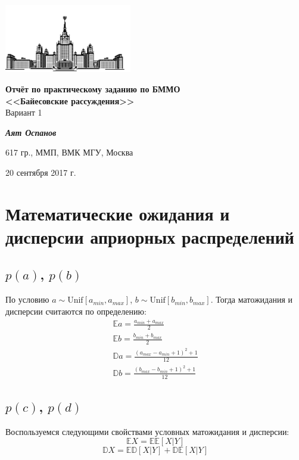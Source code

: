 \documentclass[12pt, a4paper]{article}
\begin{document}
    \begin{singlespace}
    \begin{center}
        \includegraphics[height=3cm]{msu.png}

        {\large\textbf{Отчёт по практическому заданию по БММО\\
        <<Байесовские рассуждения>>}\\
        Вариант 1}

        \vspace{0.3cm}

        \textit{\textbf{Аят Оспанов}}

        617 гр., ММП, ВМК МГУ, Москва

        20 сентября 2017 г.
    \end{center}
    \end{singlespace}

    \tableofcontents

    \section{Математические ожидания и дисперсии априорных распределений}
        \subsection{$p(a)$, $p(b)$}
            По условию $a \sim \text{Unif}[a_{min}, a_{max}]$, $b \sim \text{Unif}[b_{min}, b_{max}]$. Тогда матожидания и дисперсии считаются по определению:
            \begin{gather}
                \mathbb{E} a = \frac{a_{min} + a_{max}}{2} \\
                \mathbb{E} b = \frac{b_{min} + b_{max}}{2} \\
                \mathbb{D} a = \frac{(a_{max} - a_{min} + 1)^2 + 1}{12} \\
                \mathbb{D} b = \frac{(b_{max} - b_{min} + 1)^2 + 1}{12}
            \end{gather}

        \subsection{$p(c)$, $p(d)$}
            Воспользуемся следующими свойствами условных матожидания и дисперсии:
            $$\mathbb{E} X = \mathbb{E}\mathbb{E} [X | Y]$$
            $$\mathbb{D} X = \mathbb{E}\mathbb{D} [X | Y] + \mathbb{D}\mathbb{E} [X | Y]$$
\end{document}
